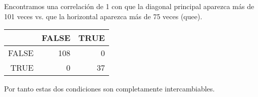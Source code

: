 Encontramos una correlación de 1 con que la diagonal principal aparezca más de 101 veces vs. que la horizontal aparezca más de 75 veces (quee).

\begin{table}[ht]
\centering
\begin{tabular}{|r|rr|}
  \hline
 & FALSE & TRUE \\ 
  \hline
FALSE & 108 &   0 \\ 
  TRUE &   0 &  37 \\ 
   \hline
\end{tabular}
\end{table}

Por tanto estas dos condiciones son completamente intercambiables.


\newpage
{}